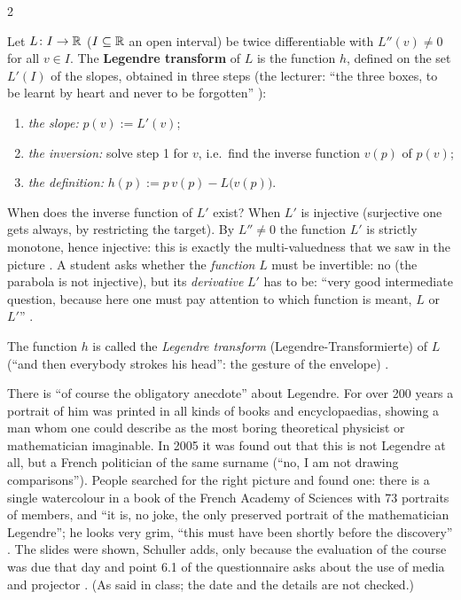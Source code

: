 \begin{paracol}{2}
\begin{definition}\label{def:lt-legendre}
Let $L\colon I\to\mathbb{R}$ ($I\subseteq\mathbb{R}$ an open interval) be twice differentiable with $L''(v)\neq0$ for all $v\in I$. The \textbf{Legendre transform} of $L$ is the function $h$, defined on the set $L'(I)$ of the slopes, obtained in three steps (the lecturer: ``the three boxes, to be learnt by heart and never to be forgotten'' ):
\begin{enumerate}
  \item \emph{the slope:} $p(v):=L'(v)$;
  \item \emph{the inversion:} solve step 1 for $v$, i.e.\ find the inverse function $v(p)$ of $p(v)$;
  \item \emph{the definition:} $h(p):=p\,v(p)-L\bigl(v(p)\bigr)$.
\end{enumerate}
\end{definition}
\begin{coursenote}\label{cn:lt-inverse}
When does the inverse function of $L'$ exist? When $L'$ is injective (surjective one gets always, by restricting the target). By $L''\neq0$ the function $L'$ is strictly monotone, hence injective: this is exactly the multi-valuedness that we saw in the picture . A student asks whether the \emph{function} $L$ must be invertible: no (the parabola is not injective), but its \emph{derivative} $L'$ has to be: ``very good intermediate question, because here one must pay attention to which function is meant, $L$ or $L'$'' .
\end{coursenote}
The function $h$ is called the \emph{Legendre transform} (Legendre-Transformierte) of $L$ (``and then everybody strokes his head'': the gesture of the envelope) .

\begin{aside}\label{as:lt-portrait}
There is ``of course the obligatory anecdote'' about Legendre. For over 200 years a portrait of him was printed in all kinds of books and encyclopaedias, showing a man whom one could describe as the most boring theoretical physicist or mathematician imaginable. In 2005 it was found out that this is not Legendre at all, but a French politician of the same surname (``no, I am not drawing comparisons''). People searched for the right picture and found one: there is a single watercolour in a book of the French Academy of Sciences with 73 portraits of members, and ``it is, no joke, the only preserved portrait of the mathematician Legendre''; he looks very grim, ``this must have been shortly before the discovery'' . The slides were shown, Schuller adds, only because the evaluation of the course was due that day and point 6.1 of the questionnaire asks about the use of media and projector . (As said in class; the date and the details are not checked.)
\end{aside}


\end{paracol}
